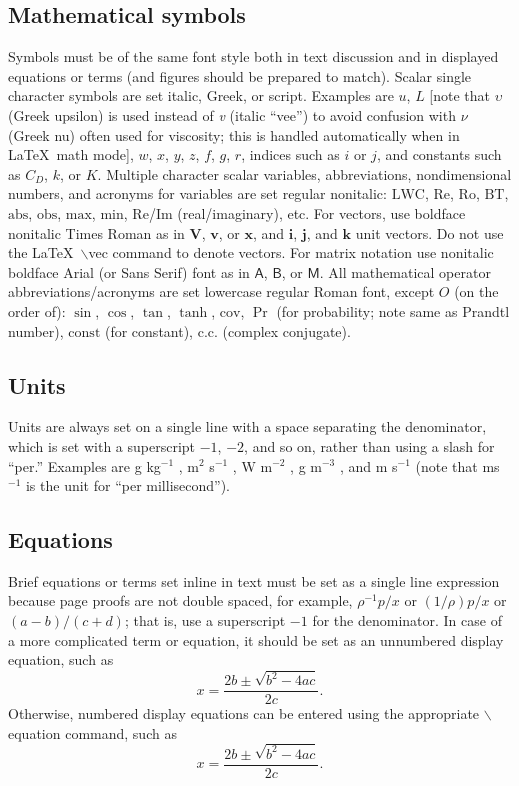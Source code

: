 \documentclass[12pt]{article}
\begin{document}
\subsection{Mathematical symbols}
Symbols must be of the same font style both in text discussion and in displayed equations or terms (and figures should be prepared to match). Scalar single character symbols are set italic, Greek, or script. Examples are $u$, $L$ [note that $\upsilon$ (Greek upsilon) is used instead of \textit{v} (italic ``vee'') to avoid confusion with $\nu$ (Greek nu) often used for viscosity; this is handled automatically when in \LaTeX\ math mode], $w$, $x$, $y$, $z$, $f$, $g$, $r$, indices such as $i$ or $j$, and constants such as $C_D$, $k$, or $K$. Multiple character scalar variables, abbreviations, nondimensional numbers, and acronyms for variables are set regular nonitalic: $\mathrm{LWC}$, $\mathrm{Re}$,  $\mathrm{Ro}$, $\mathrm{BT}$, $\mathrm{abs}$, $\mathrm{obs}$, $\mathrm{max}$, $\mathrm{min}$, $\mathrm{Re}$/$\mathrm{Im}$ (real/imaginary), etc. For vectors, use boldface nonitalic Times Roman as in $\mathbf{V}$, $\mathbf{v}$, or $\mathbf{x}$, and $\mathbf{i}$, $\mathbf{j}$, and $\mathbf{k}$ unit vectors. Do not use the \LaTeX\ $\backslash$vec command to denote vectors. For matrix notation use nonitalic boldface Arial (or Sans Serif) font as in $\bm{\mathsf{A}}$, $\bm{\mathsf{B}}$, or $\bm{\mathsf{M}}$. All mathematical operator abbreviations/acronyms are set lowercase regular Roman font, except $O$ (on the order of): $\sin$, $\cos$, $\tan$, $\tanh$, $\mathrm{cov}$, $\Pr$ (for probability; note same as Prandtl number), $\mathrm{const}$ (for constant), $\mathrm{c.c.}$ (complex conjugate).

\subsection{Units}
Units are always set on a single line with a space separating the denominator, which is set with a superscript $-1$, $-2$, and so on, rather than using a slash for ``per.'' Examples are g kg$^{-1}$ , m$^2$ s$^{-1}$ , W m$^{-2}$ , g m$^{-3}$ , and m s$^{-1}$ (note that ms$^{-1}$ is the unit for ``per millisecond'').

\subsection{Equations}
Brief equations or terms set inline in text must be set as a single line expression because page proofs are not double spaced, for example, $\rho^{-1}p/x$ or $(1/{\rho})p/x$  or $(a-b)/(c+d)$; that is, use a superscript $-1$ for the denominator. In case of a more complicated term or equation, it should be set as an unnumbered display equation, such as
\begin{displaymath}
x=\frac{2b\pm\sqrt{b^{2}-4ac}}{2c}.
\end{displaymath}
Otherwise, numbered display equations can be entered using the appropriate
$\backslash$equation command, such as
\begin{equation}
x=\frac{2b\pm\sqrt{b^{2}-4ac}}{2c}.
\end{equation}
\end{document}
